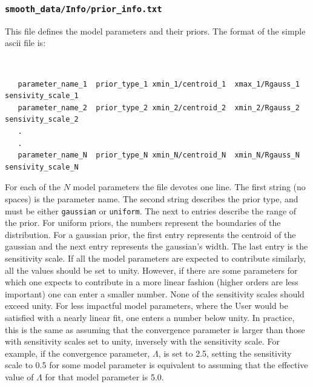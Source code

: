 \documentclass[UserManual.tex]{subfiles}
\begin{document}
\subsubsection{{\tt smooth\_data/Info/prior\_info.txt}}
This file defines the model parameters and their priors. The format of the simple ascii file is:
{\tt
\begin{verbatim}
   parameter_name_1  prior_type_1 xmin_1/centroid_1  xmax_1/Rgauss_1  sensivity_scale_1
   parameter_name_2  prior_type_2 xmin_2/centroid_2  xmin_2/Rgauss_2  sensivity_scale_2
   .
   .
   parameter_name_N  prior_type_N xmin_N/centroid_N  xmin_N/Rgauss_N  sensivity_scale_N\end{verbatim}
 }
For each of the $N$ model parameters the file devotes one line. The first string (no spaces) is the parameter name. The second string describes the prior type, and must be either {\tt gaussian} or {\tt uniform}. The next to entries describe the range of the prior. For uniform priors, the numbers represent the boundaries of the distribution. For a gaussian prior, the first entry represents the centroid of the gaussian and the next entry  represents the gaussian's width. The last entry is the sensitivity scale. If all the model parameters are expected to contribute similarly, all the values should be set to unity. However, if there are some parameters for which one expects to contribute in a more linear fashion (higher orders are less important) one can enter a smaller number. None of the sensitivity scales should exceed unity. For less impactful model parameters, where the User would be satisfied with a nearly linear fit, one enters a number below unity. In practice, this is the same as assuming that the convergence parameter is larger than those with sensitivity scales set to unity, inversely with the sensitivity scale. For example, if the convergence parameter, $\Lambda$, is set to 2.5, setting the sensitivity scale to 0.5 for some model parameter is equivalent to assuming that the effective value of $\Lambda$ for that model parameter is 5.0. 
\end{document}
